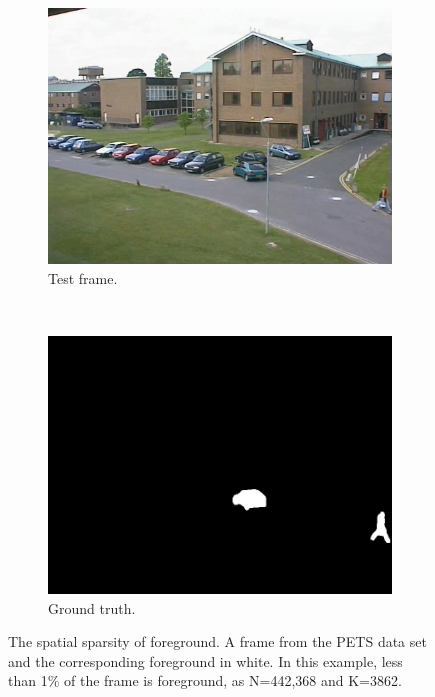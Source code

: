 \begin{figure}
        \centering
        \begin{subfigure}[b]{0.4\textwidth}%
                \centering
                \includegraphics[width=\textwidth]{camReal}
                \caption{Test frame.}
        \end{subfigure}%
        ~ %
        \begin{subfigure}[b]{0.4\textwidth}
                \centering
                \includegraphics[width=\textwidth]{camGT}
                \caption{Ground truth.}
        \end{subfigure}
\caption{The spatial sparsity of foreground. A frame from the PETS data set  \citep{pets2001} and the corresponding foreground in white. In this example, less than 1\% of the frame is foreground, as N=442,368 and K=3862.  }\label{fig:sparse}
\end{figure}

